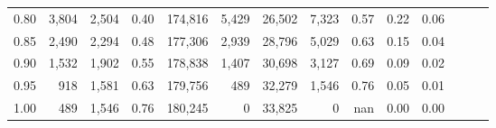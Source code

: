 \begin{tabular}{rrrrrrrrrrrrrr}
0.80 &   3,804 &  2,504 &  0.40 &  174,816 &    5,429 &  26,502 &   7,323 &  0.57 &  0.22 &      0.06 \\
0.85 &   2,490 &  2,294 &  0.48 &  177,306 &    2,939 &  28,796 &   5,029 &  0.63 &  0.15 &      0.04 \\
0.90 &   1,532 &  1,902 &  0.55 &  178,838 &    1,407 &  30,698 &   3,127 &  0.69 &  0.09 &      0.02 \\
0.95 &     918 &  1,581 &  0.63 &  179,756 &      489 &  32,279 &   1,546 &  0.76 &  0.05 &      0.01 \\
1.00 &     489 &  1,546 &  0.76 &  180,245 &        0 &  33,825 &       0 &   nan &  0.00 &      0.00 \\
\bottomrule
\end{tabular}
